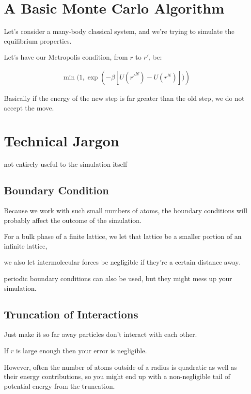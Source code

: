 \documentclass[fleqn]{report}
\newcommand{\equations} [1] {
\begin{gather*}
#1
\end{gather*}
}
\begin{document}
\section{A Basic Monte Carlo Algorithm}
Let's consider a many-body classical system, and we're trying to simulate 
the equilibrium properties. 

Let's have our Metropolis condition, from $r$ to $r'$, be:
\equations{
    \min(1, \exp \left(
        -\beta [U(r'^N) - U(r^N)])
        \right)
}
Basically if the energy of the new step is far greater than the old step, 
we do not accept the move. 

\section{Technical Jargon}
not entirely useful to the simulation itself 


\subsection{Boundary Condition}
Because we work with such small numbers of atoms, the boundary conditions 
will probably affect the outcome of the simulation. 

For a bulk phase of a finite lattice, we let that lattice be a smaller portion of 
an infinite lattice, 

we also let intermolecular forces be negligible if they're a certain 
distance away. 

periodic boundary conditions can also be used, but they might mess 
up your simulation. 

\subsection{Truncation of Interactions}
Just make it so far away particles don't interact with each other. 

If $r$ is large enough then your error is negligible.

However, often the number of atoms outside of a radius is quadratic as well as 
their energy contributions, so you might end up with a non-negligible tail 
of potential energy from the truncation. 
\end{document}
